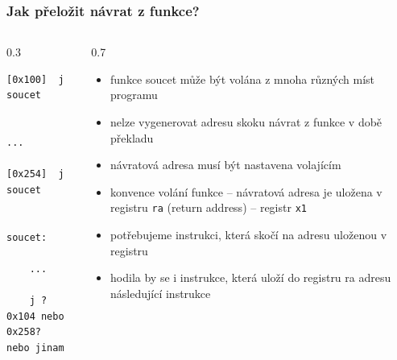 \documentclass{beamer}
\begin{document}
\begin{frame}[fragile]
\frametitle{Jak přeložit návrat z funkce?}

\begin{columns}
\begin{column}{0.3\textwidth}  
\begin{verbatim}
[0x100]  j  soucet
         
         ...
         
[0x254]  j  soucet
    

soucet:

    ...
    
    j ? 
0x104 nebo 0x258?
nebo jinam
\end{verbatim}
\end{column}
\begin{column}{0.7\textwidth}
\begin{itemize}
 \item funkce soucet může být volána z mnoha různých míst programu
 \item nelze vygenerovat adresu skoku návrat z funkce v době překladu
 \item návratová adresa musí být nastavena volajícím
 \item konvence volání funkce -- návratová adresa je uložena v registru \texttt{ra} (return address) -- registr \texttt{x1}
 \item potřebujeme instrukci, která skočí na adresu uloženou v registru
 \item hodila by se i instrukce, která uloží do registru ra adresu následující instrukce
\end{itemize}
\end{column}
\end{columns}
\end{frame}
\end{document}
